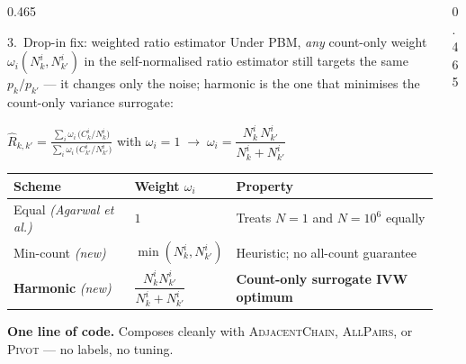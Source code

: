 \documentclass[final]{beamer}
\newcommand{\hl}[1]{\textcolor{accent}{\textbf{#1}}}
\begin{document}
\begin{frame}[t]{}
\begin{columns}[t]
\begin{column}{0.465\paperwidth}
\begin{block}{\textcolor{accent}{3.}\ Drop-in fix: weighted ratio estimator}
Under PBM, \emph{any} count-only weight $\omega_i(N_k^i,N_{k'}^i)$ in the self-normalised ratio estimator still targets the same $p_k/p_{k'}$ --- it changes only the noise; harmonic is the one that minimises the count-only variance surrogate:
\smallskip
\begin{center}\colorbox{ink}{\parbox{0.94\linewidth}{\vspace{0.12cm}\centering\color{white}\normalsize
$\displaystyle \hat R_{k,k'} = \frac{\sum_i \omega_i\,\bigl(C_k^i / N_k^i\bigr)}{\sum_i \omega_i\,\bigl(C_{k'}^i / N_{k'}^i\bigr)}$
\quad with \quad
$\omega_i = 1 \;\longrightarrow\; \omega_i = \dfrac{N_k^i\,N_{k'}^i}{N_k^i + N_{k'}^i}$
\vspace{0.12cm}}}\end{center}
\smallskip
\begin{center}
\setlength{\tabcolsep}{12pt}\renewcommand{\arraystretch}{1.45}
\begin{tabular}{lll}
\toprule
\textbf{Scheme} & \textbf{Weight $\omega_i$} & \textbf{Property}\\
\midrule
Equal \textit{(Agarwal et al.)} & $1$ & Treats $N{=}1$ and $N{=}10^6$ equally\\
Min-count \textit{(new)}    & $\min(N_k^i,N_{k'}^i)$ & Heuristic; no all-count guarantee\\
\rowcolor{soft}\textbf{Harmonic} \textit{(new)} & $\dfrac{N_k^i N_{k'}^i}{N_k^i+N_{k'}^i}$ & \textbf{Count-only surrogate IVW optimum}\\
\bottomrule
\end{tabular}
\end{center}
\smallskip
\hl{One line of code.} Composes cleanly with \textsc{AdjacentChain}, \textsc{AllPairs}, or \textsc{Pivot} --- no labels, no tuning.
\end{block}

\end{column}

\begin{column}{0.465\paperwidth}


\end{column}
\end{columns}
\end{frame}
\end{document}
